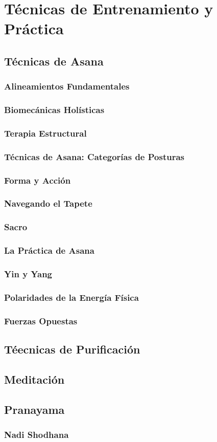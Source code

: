 \chapter{Técnicas de Entrenamiento y Práctica}
\section{Técnicas de Asana}
\subsection{Alineamientos Fundamentales}
\subsection{Biomecánicas Holísticas}
\subsection{Terapia Estructural}
\subsection{Técnicas de Asana: Categorías de Posturas}
\subsection{Forma y Acción}
\subsection{Navegando el Tapete}
\subsection{Sacro}
\subsection{La Práctica de Asana}
\subsection{Yin y Yang}
\subsection{Polaridades de la Energía Física}
\subsection{Fuerzas Opuestas}
\section{Téecnicas de Purificación}
\section{Meditación}
\section{Pranayama}
\subsection{Nadi Shodhana}

